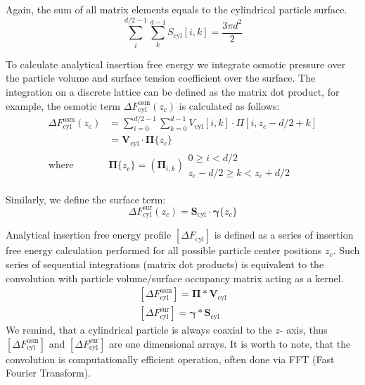 \documentclass[12pt, a4paper]{article}
\begin{document}
Again, the sum of all matrix elements equals to the cylindrical particle surface.
\begin{equation}
    \sum_{i}^{d/2-1} \sum_{k}^{d-1} S_{\textrm{cyl}}[i, k] = \frac{3 \pi d^2}{2}
\end{equation}

To calculate analytical insertion free energy we integrate osmotic pressure over the particle volume and surface tension coefficient over the surface.
The integration on a discrete lattice can be defined as the matrix dot product, for example, the osmotic term $\Delta F_{\textrm{cyl}}^{\textrm{osm}}(z_c)$ is calculated as follows:
\begin{equation}\label{eq:cyl_fe_osm}
    \begin{split}
        \Delta F_{\textrm{cyl}}^{\textrm{osm}}(z_c) &= \sum_{i=0}^{d/2-1} \sum_{k=0}^{d-1} V_{\textrm{cyl}}[i, k] \cdot \Pi[i, z_c-d/2+k] 
        \\   &= \mathbf{V}_{\textrm{cyl}} \cdot  \bm{\Pi}\{z_c\}
        \\ \text{where } &\bm{\Pi}\{z_c\} =\left(\bm{\Pi}_{i,k}\right) {\substack{0 \ge i < d/2 \\ z_c-d/2 \ge k < z_c+d/2}}
    \end{split}
\end{equation}

Similarly, we define the surface term:
\begin{equation}\label{eq:cyl_fe_sur}
    \Delta F_{\textrm{cyl}}^{\textrm{sur}}(z_c) = \mathbf{S}_{\textrm{cyl}} \cdot  \bm{\gamma}\{z_c\}
\end{equation}


Analytical insertion free energy profile $\left[\Delta F_{\textrm{cyl}}\right]$ is defined as a series of insertion free energy calculation performed for all possible particle center positions $z_c$.
Such series of sequential integrations (matrix dot products) is equivalent to the convolution with particle volume/surface occupancy matrix acting as a kernel.
\begin{eqnarray}
    \left[\Delta F_{\textrm{cyl}}^{\textrm{osm}}\right] = \mathbf{\Pi} \ast \mathbf{V}_{\textrm{cyl}}
    \\
    \left[\Delta F_{\textrm{cyl}}^{\textrm{sur}}\right] = \bm{\gamma} \ast \mathbf{S}_{\textrm{cyl}}
\end{eqnarray}
We remind, that a cylindrical particle is always coaxial to the $z$- axis, thus $\left[\Delta F_{\textrm{cyl}}^{\textrm{osm}}\right]$ and  $\left[\Delta F_{\textrm{cyl}}^{\textrm{sur}}\right]$ are one dimensional arrays.
It is worth to note, that the convolution is computationally efficient operation, often done via FFT (Fast Fourier Transform).
\end{document}
